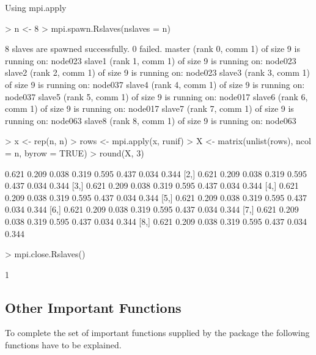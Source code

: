 \begin{Example} Using mpi.apply
\label{ex:Rmpi3}
\begin{Schunk}
\begin{Sinput}
> n <- 8
> mpi.spawn.Rslaves(nslaves = n)
\end{Sinput}
\begin{Soutput}
	8 slaves are spawned successfully. 0 failed.
master (rank 0, comm 1) of size 9 is running on: node023 
slave1 (rank 1, comm 1) of size 9 is running on: node023 
slave2 (rank 2, comm 1) of size 9 is running on: node023 
slave3 (rank 3, comm 1) of size 9 is running on: node037 
slave4 (rank 4, comm 1) of size 9 is running on: node037 
slave5 (rank 5, comm 1) of size 9 is running on: node017 
slave6 (rank 6, comm 1) of size 9 is running on: node017 
slave7 (rank 7, comm 1) of size 9 is running on: node063 
slave8 (rank 8, comm 1) of size 9 is running on: node063 
\end{Soutput}
\begin{Sinput}
> x <- rep(n, n)
> rows <- mpi.apply(x, runif)
> X <- matrix(unlist(rows), ncol = n, byrow = TRUE)
> round(X, 3)
\end{Sinput}
\begin{Soutput}
      [,1]  [,2]  [,3]  [,4]  [,5]  [,6]  [,7]  [,8]
[1,] 0.621 0.209 0.038 0.319 0.595 0.437 0.034 0.344
[2,] 0.621 0.209 0.038 0.319 0.595 0.437 0.034 0.344
[3,] 0.621 0.209 0.038 0.319 0.595 0.437 0.034 0.344
[4,] 0.621 0.209 0.038 0.319 0.595 0.437 0.034 0.344
[5,] 0.621 0.209 0.038 0.319 0.595 0.437 0.034 0.344
[6,] 0.621 0.209 0.038 0.319 0.595 0.437 0.034 0.344
[7,] 0.621 0.209 0.038 0.319 0.595 0.437 0.034 0.344
[8,] 0.621 0.209 0.038 0.319 0.595 0.437 0.034 0.344
\end{Soutput}
\begin{Sinput}
> mpi.close.Rslaves()
\end{Sinput}
\begin{Soutput}
[1] 1
\end{Soutput}
\end{Schunk}
\end{Example}

\subsection{Other Important Functions}

To complete the set of important functions supplied by the 
package the following functions have to be explained.

